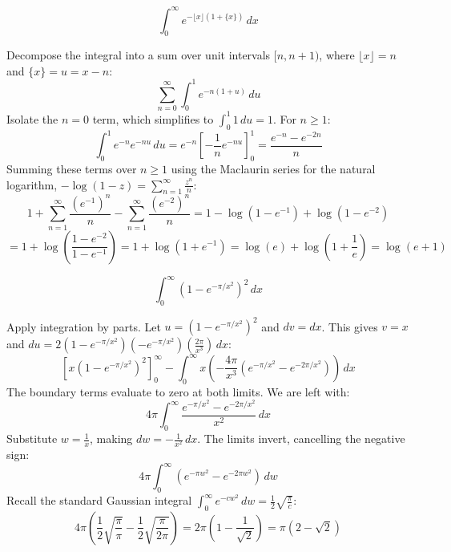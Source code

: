 \begin{questions}
    \question \[ \int_0^\infty e^{-\lfloor x \rfloor (1 + \{x\})} \,dx \]
    \begin{solution}
        Decompose the integral into a sum over unit intervals $[n, n+1)$, where $\lfloor x \rfloor = n$ and $\{x\} = u = x - n$:
        \[ \sum_{n=0}^\infty \int_0^1 e^{-n(1 + u)} \,du \]
        Isolate the $n=0$ term, which simplifies to $\int_0^1 1 \,du = 1$. For $n \ge 1$:
        \[ \int_0^1 e^{-n} e^{-nu} \,du = e^{-n} \left[ -\frac{1}{n} e^{-nu} \right]_0^1 = \frac{e^{-n} - e^{-2n}}{n} \]
        Summing these terms over $n \ge 1$ using the Maclaurin series for the natural logarithm, $-\log(1 - z) = \sum_{n=1}^\infty \frac{z^n}{n}$:
        \[ 1 + \sum_{n=1}^\infty \frac{(e^{-1})^n}{n} - \sum_{n=1}^\infty \frac{(e^{-2})^n}{n} = 1 - \log(1 - e^{-1}) + \log(1 - e^{-2}) \]
        \[ = 1 + \log\left(\frac{1 - e^{-2}}{1 - e^{-1}}\right) = 1 + \log(1 + e^{-1}) = \log(e) + \log\left(1 + \frac{1}{e}\right) = \log(e + 1) \]
    \end{solution}

    \question \[ \int_0^\infty \left(1 - e^{-\pi/x^2}\right)^2 \,dx \]
    \begin{solution}
        Apply integration by parts. Let $u = \left(1 - e^{-\pi/x^2}\right)^2$ and $dv = dx$. This gives $v = x$ and $du = 2\left(1 - e^{-\pi/x^2}\right)\left(-e^{-\pi/x^2}\right)\left(\frac{2\pi}{x^3}\right) \,dx$:
        \[ \left[ x\left(1 - e^{-\pi/x^2}\right)^2 \right]_0^\infty - \int_0^\infty x \left( -\frac{4\pi}{x^3} \left(e^{-\pi/x^2} - e^{-2\pi/x^2}\right) \right) \,dx \]
        The boundary terms evaluate to zero at both limits. We are left with:
        \[ 4\pi \int_0^\infty \frac{e^{-\pi/x^2} - e^{-2\pi/x^2}}{x^2} \,dx \]
        Substitute $w = \frac{1}{x}$, making $dw = -\frac{1}{x^2} \,dx$. The limits invert, cancelling the negative sign:
        \[ 4\pi \int_0^\infty \left(e^{-\pi w^2} - e^{-2\pi w^2}\right) \,dw \]
        Recall the standard Gaussian integral $\int_0^\infty e^{-cw^2} \,dw = \frac{1}{2}\sqrt{\frac{\pi}{c}}$:
        \[ 4\pi \left( \frac{1}{2}\sqrt{\frac{\pi}{\pi}} - \frac{1}{2}\sqrt{\frac{\pi}{2\pi}} \right) = 2\pi \left( 1 - \frac{1}{\sqrt{2}} \right) = \pi(2 - \sqrt{2}) \]
    \end{solution}
\end{questions}

